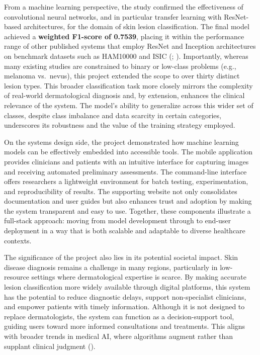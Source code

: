 \documentclass[
  12pt,
  oneside]{article}
\begin{document}
From a machine learning perspective, the study confirmed the
effectiveness of convolutional neural networks, and in particular
transfer learning with ResNet-based architectures, for the domain of
skin lesion classification. The final model achieved a \textbf{weighted
F1-score of 0.7539}, placing it within the performance range of other
published systems that employ ResNet and Inception architectures on
benchmark datasets such as HAM10000 and ISIC
(;
). Importantly,
whereas many existing studies are constrained to binary or low-class
problems (e.g., melanoma vs.~nevus), this project extended the scope to
over thirty distinct lesion types. This broader classification task more
closely mirrors the complexity of real-world dermatological diagnosis
and, by extension, enhances the clinical relevance of the system. The
model's ability to generalize across this wider set of classes, despite
class imbalance and data scarcity in certain categories, underscores its
robustness and the value of the training strategy employed.

On the systems design side, the project demonstrated how machine
learning models can be effectively embedded into accessible tools. The
mobile application provides clinicians and patients with an intuitive
interface for capturing images and receiving automated preliminary
assessments. The command-line interface offers researchers a lightweight
environment for batch testing, experimentation, and reproducibility of
results. The supporting website not only consolidates documentation and
user guides but also enhances trust and adoption by making the system
transparent and easy to use. Together, these components illustrate a
full-stack approach: moving from model development through to end-user
deployment in a way that is both scalable and adaptable to diverse
healthcare contexts.

The significance of the project also lies in its potential societal
impact. Skin disease diagnosis remains a challenge in many regions,
particularly in low-resource settings where dermatological expertise is
scarce. By making accurate lesion classification more widely available
through digital platforms, this system has the potential to reduce
diagnostic delays, support non-specialist clinicians, and empower
patients with timely information. Although it is not designed to replace
dermatologists, the system can function as a decision-support tool,
guiding users toward more informed consultations and treatments. This
aligns with broader trends in medical AI, where algorithms augment
rather than supplant clinical judgment
().
\end{document}
